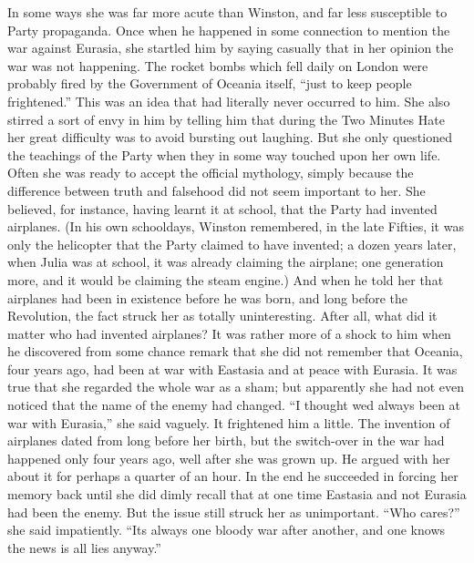 \begin{paracol}{2}
In some ways she was far more acute than Winston, and far less
susceptible to Party propaganda. Once when he happened in some
connection to mention the war against Eurasia, she startled him by
saying casually that in her opinion the war was not happening. The
rocket bombs which fell daily on London were probably fired by the
Government of Oceania itself, ``just to keep people frightened.'' This was
an idea that had literally never occurred to him. She also stirred a
sort of envy in him by telling him that during the Two Minutes Hate her
great difficulty was to avoid bursting out laughing. But she only
questioned the teachings of the Party when they in some way touched upon
her own life. Often she was ready to accept the official mythology,
simply because the difference between truth and falsehood did not seem
important to her. She believed, for instance, having learnt it at
school, that the Party had invented airplanes. (In his own schooldays,
Winston remembered, in the late Fifties, it was only the helicopter that
the Party claimed to have invented; a dozen years later, when Julia was
at school, it was already claiming the airplane; one generation more,
and it would be claiming the steam engine.) And when he told her that
airplanes had been in existence before he was born, and long before the
Revolution, the fact struck her as totally uninteresting. After all,
what did it matter who had invented airplanes? It was rather more of a
shock to him when he discovered from some chance remark that she did not
remember that Oceania, four years ago, had been at war with Eastasia and
at peace with Eurasia. It was true that she regarded the whole war as a
sham; but apparently she had not even noticed that the name of the enemy
had changed. ``I thought we\textquotesingle d always been at war with
Eurasia,'' she said vaguely. It frightened him a little. The invention of
airplanes dated from long before her birth, but the switch-over in the
war had happened only four years ago, well after she was grown up. He
argued with her about it for perhaps a quarter of an hour. In the end he
succeeded in forcing her memory back until she did dimly recall that at
one time Eastasia and not Eurasia had been the enemy. But the issue
still struck her as unimportant. ``Who cares?'' she said impatiently.
``It\textquotesingle s always one bloody war after another, and one knows
the news is all lies anyway.''

\switchcolumn


\end{paracol}
